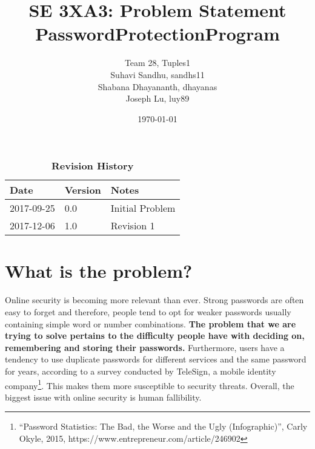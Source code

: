 \documentclass{article}
\title{SE 3XA3: Problem Statement\\PasswordProtectionProgram}
\author{Team 28, Tuples1
		\\ Suhavi Sandhu, sandhs11
		\\ Shabana Dhayananth, dhayanas
		\\ Joseph Lu, luy89
}
\date{\today}
\begin{document}
\maketitle

\tableofcontents
\listoftables


\begin{table}[bp]
\caption{\bf Revision History} \label{TblRevisionHistory}
\begin{tabularx}{\textwidth}{p{3cm}p{2cm}X}
\toprule {\bf Date} & {\bf Version} & {\bf Notes}\\
\midrule
2017-09-25 & 0.0 & Initial Problem\\
2017-12-06 & 1.0 & Revision 1\\
\bottomrule
\end{tabularx}
\end{table}

\newpage


\section{What is the problem?}
Online security is becoming more relevant than ever. Strong passwords are often easy to forget and therefore, people tend to opt for weaker passwords usually containing simple word or number combinations. \textbf{The problem that we are trying to solve pertains to the difficulty people have with deciding on, remembering and storing their passwords.} Furthermore, users have a tendency to use duplicate passwords for different services and the same password for years, according to a survey conducted by TeleSign, a mobile identity company\footnote{“Password Statistics: The Bad, the Worse and the Ugly (Infographic)”, Carly Okyle, 2015, https://www.entrepreneur.com/article/246902}. This makes them more susceptible to security threats. Overall, the biggest issue with online security is human fallibility.
\end{document}
